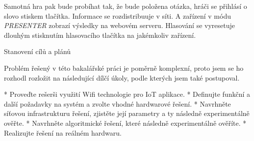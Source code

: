 Samotná hra pak bude probíhat tak, že bude položena otázka, hráči se přihlásí o slovo stiskem tlačítka. Informace se rozdistribuuje v síti. A zařízení v módu {\em PRESENTER} zobrazí výsledky na webovém serveru. Hlasování se vyresetuje dlouhým stisknutím hlasovacího tlačítka na jakémkoliv zařízení.

\sec Stanovení cílů a plánů

Problém řešený v této bakalářské práci je poměrně komplexní, proto jsem se ho rozhodl rozložit na následující dílčí úkoly, podle kterých jsem také postupoval.

\begitems
* Proveďte rešerši využití Wifi technologie pro IoT aplikace.
* Definujte funkční a další požadavky na systém a zvolte vhodné hardwarové řešení.
* Navrhněte síťovou infrastrukturu řešení, zjistěte její parametry a ty následně experimentálně ověřte.
* Navrhněte algoritmické řešení, které následně experimentálně ověříte.
* Realizujte řešení na reálném hardwaru. 

\enditems